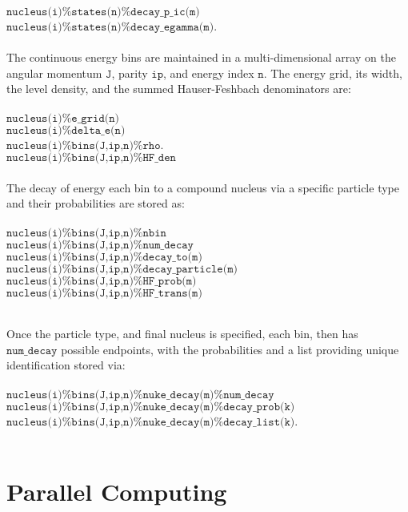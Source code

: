\documentclass[
10pt,
showpacs,preprintnumbers,footinbib,
amsfonts,amsmath,amssymb,
aps,
prc,twocolumn,groupedaddress,superscriptaddress,
showkeys,
nofootinbib
]{revtex4-1}
\begin{document}
${\texttt{nucleus(i)\%states(n)\%decay\_p\_ic(m)}}$\\
${\texttt{nucleus(i)\%states(n)\%decay\_egamma(m)}}$.\\
\\
The continuous energy bins are maintained in a multi-dimensional array on the angular momentum ${\texttt{J}}$, parity ${\texttt{ip}}$, and energy index ${\texttt{n}}$. The energy grid, its width, the level density, and the summed Hauser-Feshbach denominators are:\\
\\
${\texttt{nucleus(i)\%e\_grid(n)}}$\\
${\texttt{nucleus(i)\%delta\_e(n)}}$\\
${\texttt{nucleus(i)\%bins(J,ip,n)\%rho}}$.\\
${\texttt{nucleus(i)\%bins(J,ip,n)\%HF\_den}}$\\
\\
The decay of energy each bin to a compound nucleus via a specific particle type and their probabilities are stored as:\\
\\
${\texttt{nucleus(i)\%bins(J,ip,n)\%nbin}}$\\
${\texttt{nucleus(i)\%bins(J,ip,n)\%num\_decay}}$\\
${\texttt{nucleus(i)\%bins(J,ip,n)\%decay\_to(m)}}$\\
${\texttt{nucleus(i)\%bins(J,ip,n)\%decay\_particle(m)}}$\\
${\texttt{nucleus(i)\%bins(J,ip,n)\%HF\_prob(m)}}$\\
${\texttt{nucleus(i)\%bins(J,ip,n)\%HF\_trans(m)}}$\\
\\
\begin{widetext}
Once the particle type, and final nucleus is specified, each bin, then has ${\texttt{num\_decay}}$ possible endpoints, with the probabilities and a list providing unique identification stored via:\\
\\ 
${\texttt{nucleus(i)\%bins(J,ip,n)\%nuke\_decay(m)\%num\_decay}}$\\
${\texttt{nucleus(i)\%bins(J,ip,n)\%nuke\_decay(m)\%decay\_prob(k)}}$\\
${\texttt{nucleus(i)\%bins(J,ip,n)\%nuke\_decay(m)\%decay\_list(k)}}$.\\
\\
\end{widetext} 


\section{Parallel Computing}
\end{document}
